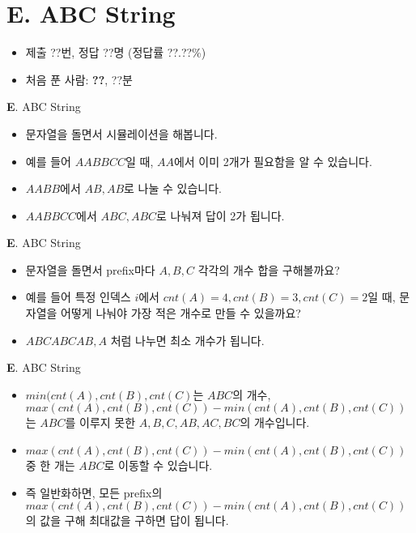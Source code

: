 \section{E. ABC String}

\begin{frame} %
    \begin{itemize}
        \item 제출 ??번, 정답 ??명 (정답률 ??.??\%)
        \item 처음 푼 사람: \textbf{??}, ??분
    \end{itemize}
\end{frame}

\begin{frame}{\textbf{E}. ABC String}
    \begin{itemize}
        \item 문자열을 돌면서 시뮬레이션을 해봅니다.
        \item 예를 들어 $AABBCC$일 때, $AA$에서 이미 2개가 필요함을 알 수 있습니다.
        \item $AABB$에서 $AB, AB$로 나눌 수 있습니다.
        \item $AABBCC$에서 $ABC, ABC$로 나눠져 답이 2가 됩니다.
    \end{itemize}
\end{frame}

\begin{frame}{\textbf{E}. ABC String}
    \begin{itemize}
        \item 문자열을 돌면서 prefix마다 $A, B, C$ 각각의 개수 합을 구해볼까요?
        \item 예를 들어 특정 인덱스 $i$에서 $cnt(A)=4, cnt(B)=3, cnt(C)=2$일 때, 문자열을 어떻게 나눠야 가장 적은 개수로 만들 수 있을까요?
        \item $ABCABCAB, A$ 처럼 나누면 최소 개수가 됩니다.
    \end{itemize}
\end{frame}

\begin{frame}{\textbf{E}. ABC String}
    \begin{itemize}
        \item $min(cnt(A),cnt(B),cnt(C)$는 $ABC$의 개수, $max(cnt(A),cnt(B),cnt(C))-min(cnt(A),cnt(B),cnt(C))$는 $ABC$를 이루지 못한 $A,B,C,AB,AC,BC$의 개수입니다.
        \item $max(cnt(A),cnt(B),cnt(C))-min(cnt(A),cnt(B),cnt(C))$ 중 한 개는 $ABC$로 이동할 수 있습니다.
        \item 즉 일반화하면, 모든 prefix의 $max(cnt(A),cnt(B),cnt(C))-min(cnt(A),cnt(B),cnt(C))$의 값을 구해 최대값을 구하면 답이 됩니다.
    \end{itemize}
\end{frame}